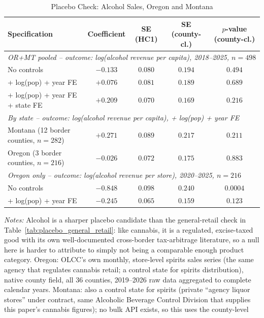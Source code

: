 \begin{table}[htbp]
\centering
\caption{Placebo Check: Alcohol Sales, Oregon and Montana}
\label{tab:placebo_alcohol}
\begin{tabular}{lcccc}
\toprule
Specification & Coefficient & SE (HC1) & SE (county-cl.) & $p$-value (county-cl.) \\
\midrule
\multicolumn{5}{l}{\textit{OR+MT pooled -- outcome: log(alcohol revenue per capita), 2018--2025, $n=498$}} \\
No controls & $-0.133$ & $0.080$ & $0.194$ & $0.494$ \\
+ log(pop) + year FE & $+0.076$ & $0.081$ & $0.189$ & $0.689$ \\
+ log(pop) + year FE + state FE & $+0.209$ & $0.070$ & $0.169$ & $0.216$ \\
\midrule
\multicolumn{5}{l}{\textit{By state -- outcome: log(alcohol revenue per capita), + log(pop) + year FE}} \\
Montana (12 border counties, $n=282$) & $+0.271$ & $0.089$ & $0.217$ & $0.211$ \\
Oregon (3 border counties, $n=216$) & $-0.026$ & $0.072$ & $0.175$ & $0.883$ \\
\midrule
\multicolumn{5}{l}{\textit{Oregon only -- outcome: log(alcohol revenue per store), 2020--2025, $n=216$}} \\
No controls & $-0.848$ & $0.098$ & $0.240$ & $0.0004$ \\
+ log(pop) + year FE & $-0.245$ & $0.065$ & $0.159$ & $0.123$ \\
\bottomrule
\end{tabular}
\begin{minipage}{0.95\textwidth}
\vspace{0.3em}
\footnotesize
\textit{Notes:} Alcohol is a sharper placebo candidate than the general-retail check in
Table~\ref{tab:placebo_general_retail}: like cannabis, it is a regulated, excise-taxed good with its own
well-documented cross-border tax-arbitrage literature, so a null here is harder to attribute to simply not
being a comparable enough product category. Oregon: OLCC's own monthly, store-level spirits sales series
(the same agency that regulates cannabis retail; a control state for spirits distribution), native county
field, all 36 counties, 2019--2026 raw data aggregated to complete calendar years. Montana: also a control
state for spirits (private ``agency liquor stores'' under contract, same Alcoholic Beverage Control
Division that supplies this paper's cannabis figures); no bulk API exists, so this uses the county-level

\end{minipage}
\end{table}
